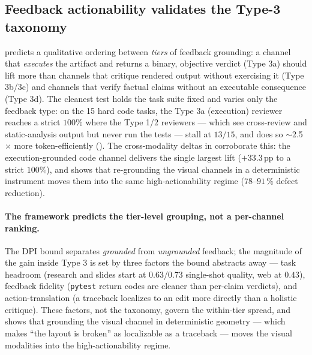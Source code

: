 \documentclass[11pt]{article}
\begin{document}
\subsection{Feedback actionability validates the Type-3 taxonomy}
\label{sec:harness-taxonomy}

 predicts a qualitative ordering between \emph{tiers} of feedback grounding: a channel that \emph{executes} the artifact and returns a binary, objective verdict (Type 3a) should lift more than channels that critique rendered output without exercising it (Type 3b/3c) and channels that verify factual claims without an executable consequence (Type 3d). The cleanest test holds the task suite fixed and varies only the feedback type: on the 15 hard code tasks, the Type 3a (execution) reviewer reaches a strict $100\%$ where the Type 1/2 reviewers --- which see cross-review and static-analysis output but never run the tests --- stall at $13/15$, and does so $\sim$2.5$\times$ more token-efficiently (). The cross-modality deltas in  corroborate this: the execution-grounded code channel delivers the single largest lift ($+33.3$\,pp to a strict $100\%$), and  shows that re-grounding the visual channels in a deterministic instrument moves them into the same high-actionability regime ($78$--$91\,\%$ defect reduction).

\paragraph{The framework predicts the tier-level grouping, not a per-channel ranking.} The DPI bound separates \emph{grounded} from \emph{ungrounded} feedback; the magnitude of the gain inside Type 3 is set by three factors the bound abstracts away --- task headroom (research and slides start at $0.63$/$0.73$ single-shot quality, web at $0.43$), feedback fidelity (\texttt{pytest} return codes are cleaner than per-claim verdicts), and action-translation (a traceback localizes to an edit more directly than a holistic critique). These factors, not the taxonomy, govern the within-tier spread, and  shows that grounding the visual channel in deterministic geometry --- which makes ``the layout is broken'' as localizable as a traceback --- moves the visual modalities into the high-actionability regime.
\end{document}
